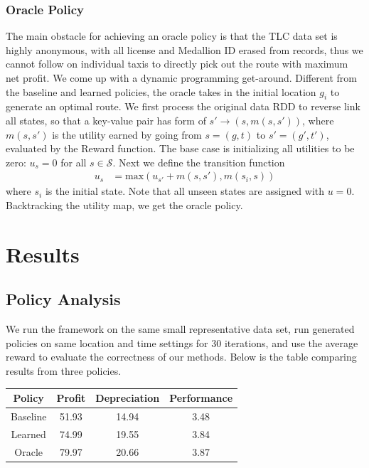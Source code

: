 \documentclass[letterpaper, 10 pt, conference]{ieeeconf}
\begin{document}
\subsubsection{Oracle Policy}
The main obstacle for achieving an oracle policy is that the TLC data set is highly anonymous, with all license and Medallion ID erased from records, thus we cannot follow on individual taxis to directly pick out the route with maximum net profit. We come up with a dynamic programming get-around. Different from the baseline and learned policies, the oracle takes in the initial location $g_i$ to generate an optimal route. We first process the original data RDD to reverse link all states, so that a key-value pair has form of $s'\to(s,m(s,s'))$, where $m(s,s')$ is the utility earned by going from $s=(g,t)$ to $s'=(g',t')$, evaluated by the Reward function. The base case is initializing all utilities to be zero: $u_s=0$ for all $s\in\mathcal{S}$. Next we define the transition function
\begin{align}
u_s &= \text{max}(u_{s'}+m(s, s'), m(s_i, s))
\end{align}
where $s_i$ is the initial state. Note that all unseen states are assigned with $u=0$. Backtracking the utility map, we get the oracle policy.
\section{Results}
\subsection{Policy Analysis}
We run the framework on the same small representative data set, run generated policies on same location and time settings for 30 iterations, and use the average reward to evaluate the correctness of our methods. Below is the table comparing results from three policies.
\begin{center}
\begin{tabular}{|c||c|c|c|}
\hline
Policy & Profit & Depreciation & Performance \\ \hline
Baseline & 51.93 & 14.94 & 3.48 \\    \hline
Learned & 74.99 & 19.55 & 3.84 \\    \hline
Oracle & 79.97 & 20.66 & 3.87 \\    \hline
\end{tabular}
\end{center}
\end{document}
